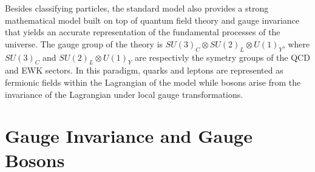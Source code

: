   Besides classifying particles, the standard model also provides a strong mathematical model built on top of quantum field theory and gauge invariance that yields an accurate representation of the fundamental processes of the universe. The gauge group of the theory is $ SU(3)_C \otimes SU(2)_L \otimes U(1)_Y $, where $ SU(3)_C $ and $ SU(2)_L \otimes U(1)_Y $ are respectivly the symetry groups of the QCD and EWK sectors. In this paradigm, quarks and leptons are represented as fermionic fields within the Lagrangian of the model while bosons arise from the invariance of the Lagrangian under local gauge transformations. \\

  \section{Gauge Invariance and Gauge Bosons}

